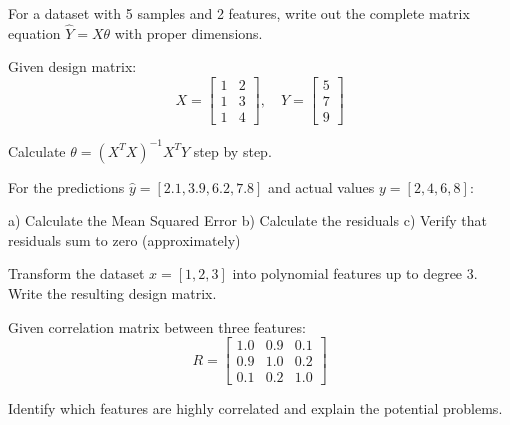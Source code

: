 \documentclass{article}
\newcounter{exercise}
\begin{document}
\begin{tcolorbox}[colback=gray!5!white,colframe=gray!75!black,title=Problem \stepcounter{exercise}: Matrix Setup]

For a dataset with 5 samples and 2 features, write out the complete matrix equation $\hat{Y} = X\theta$ with proper dimensions.
\end{tcolorbox}

\begin{tcolorbox}[colback=gray!5!white,colframe=gray!75!black,title=Problem \stepcounter{exercise}: Normal Equation Calculation]

Given design matrix:
$$X = \begin{bmatrix} 1 & 2 \\ 1 & 3 \\ 1 & 4 \end{bmatrix}, \quad Y = \begin{bmatrix} 5 \\ 7 \\ 9 \end{bmatrix}$$

Calculate $\theta = (X^T X)^{-1} X^T Y$ step by step.
\end{tcolorbox}

\begin{tcolorbox}[colback=gray!5!white,colframe=gray!75!black,title=Problem \stepcounter{exercise}: MSE Calculation]

For the predictions $\hat{y} = [2.1, 3.9, 6.2, 7.8]$ and actual values $y = [2, 4, 6, 8]$:

a) Calculate the Mean Squared Error
b) Calculate the residuals
c) Verify that residuals sum to zero (approximately)
\end{tcolorbox}

\begin{tcolorbox}[colback=gray!5!white,colframe=gray!75!black,title=Problem \stepcounter{exercise}: Polynomial Regression]

Transform the dataset $x = [1, 2, 3]$ into polynomial features up to degree 3. Write the resulting design matrix.
\end{tcolorbox}

\begin{tcolorbox}[colback=gray!5!white,colframe=gray!75!black,title=Problem \stepcounter{exercise}: Multicollinearity Detection]

Given correlation matrix between three features:
$$R = \begin{bmatrix} 1.0 & 0.9 & 0.1 \\ 0.9 & 1.0 & 0.2 \\ 0.1 & 0.2 & 1.0 \end{bmatrix}$$

Identify which features are highly correlated and explain the potential problems.
\end{tcolorbox}
\end{document}
